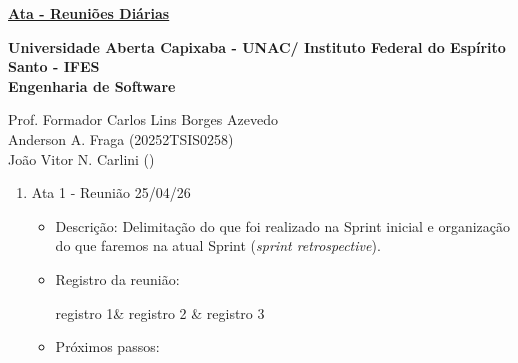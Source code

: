 \documentclass[11pt]{article}
\begin{document}
\underline{\textbf{Ata - Reuniões Diárias}}\par
\textbf{Universidade Aberta Capixaba - UNAC/ Instituto Federal do Espírito Santo - IFES}\\
\textbf{Engenharia de Software}\par
Prof. Formador Carlos Lins Borges Azevedo\\

Anderson A. Fraga (20252TSIS0258)\\
João Vitor N. Carlini ()\\

\begin{enumerate}
    \item Ata 1 - Reunião 25/04/26
        \begin{itemize}
            \item Descrição: Delimitação do que foi realizado na Sprint inicial e organização do que faremos na atual Sprint (\textit{sprint retrospective}).
            \item Registro da reunião:
                \begin{table}[!h]
                    \hline
                    registro 1& registro 2 & registro 3 \\
                    \hline
                \end{table}
            \item Próximos passos: 
        \end{itemize}
\end{enumerate}
\end{document}
